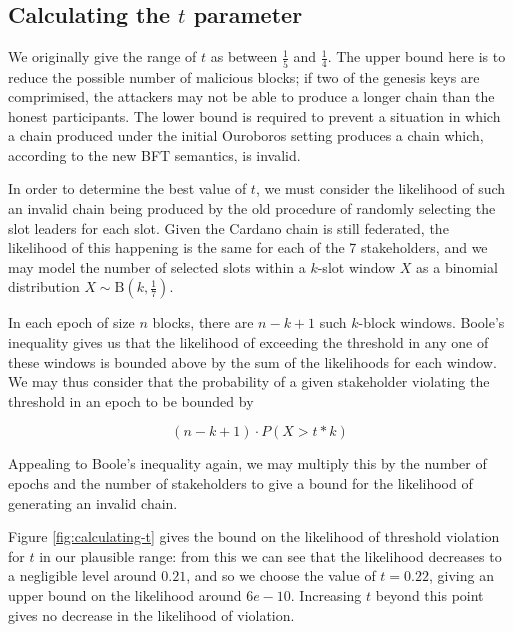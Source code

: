 \documentclass[11pt,a4paper]{article}
\begin{document}
\begin{appendices}
  \section{Calculating the $t$ parameter}
  \label{apdx:calculating-t}

  We originally give the range of $t$ as between $\frac{1}{5}$ and $\frac{1}{4}$.
  The upper bound here is to reduce the possible number of malicious blocks; if
  two of the genesis keys are comprimised, the attackers may not be able to
  produce a longer chain than the honest participants. The lower bound is required
  to prevent a situation in which a chain produced under the initial Ouroboros
  setting produces a chain which, according to the new BFT semantics, is invalid.

  In order to determine the best value of $t$, we must consider the likelihood of
  such an invalid chain being produced by the old procedure of randomly selecting
  the slot leaders for each slot. Given the Cardano chain is still federated, the
  likelihood of this happening is the same for each of the 7 stakeholders, and we
  may model the number of selected slots within a $k$-slot window $X$ as a binomial
  distribution $X \sim \mathrm{B}\left(k, \frac{1}{7}\right)$.

  In each epoch of size $n$ blocks, there are $n-k+1$ such $k$-block windows.
  Boole's inequality gives us that the likelihood of exceeding the threshold in
  any one of these windows is bounded above by the sum of the likelihoods for each
  window. We may thus consider that the probability of a given stakeholder
  violating the threshold in an epoch to be bounded by

  $$(n-k+1)\cdot P(X > t*k)$$

  Appealing to Boole's inequality again, we may multiply this by the number of
  epochs and the number of stakeholders to give a bound for the likelihood of
  generating an invalid chain.

  Figure \ref{fig:calculating-t} gives the bound on the likelihood of threshold
  violation for $t$ in our plausible range: from this we can see that the
  likelihood decreases to a negligible level around $0.21$, and so we choose the
  value of $t=0.22$, giving an upper bound on the likelihood around $6e-10$.
  Increasing $t$ beyond this point gives no decrease in the likelihood of
  violation.


\end{appendices}
\end{document}
